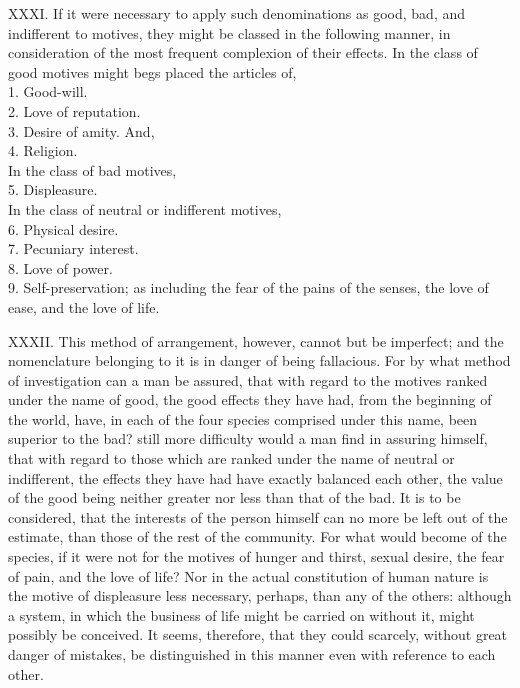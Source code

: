 \documentclass[12pt]{report}
\begin{document}
XXXI. If it were necessary to apply such denominations as good, bad, and
indifferent to motives, they might be classed in the following manner,
in consideration of the most frequent complexion of their effects. In
the class of good motives might begs placed the articles of,\\
1. Good-will.\\
2. Love of reputation.\\
3. Desire of amity. And,\\
4. Religion.\\
In the class of bad motives,\\
5. Displeasure.\\
In the class of neutral or indifferent motives,\\
6. Physical desire.\\
7. Pecuniary interest.\\
8. Love of power.\\
9. Self-preservation; as including the fear of the pains of the senses,
the love of ease, and the love of life.

XXXII. This method of arrangement, however, cannot but be imperfect; and
the nomenclature belonging to it is in danger of being fallacious. For
by what method of investigation can a man be assured, that with regard
to the motives ranked under the name of good, the good effects they have
had, from the beginning of the world, have, in each of the four species
comprised under this name, been superior to the bad? still more
difficulty would a man find in assuring himself, that with regard to
those which are ranked under the name of neutral or indifferent, the
effects they have had have exactly balanced each other, the value of the
good being neither greater nor less than that of the bad. It is to be
considered, that the interests of the person himself can no more be left
out of the estimate, than those of the rest of the community. For what
would become of the species, if it were not for the motives of hunger
and thirst, sexual desire, the fear of pain, and the love of life? Nor
in the actual constitution of human nature is the motive of displeasure
less necessary, perhaps, than any of the others: although a system, in
which the business of life might be carried on without it, might
possibly be conceived. It seems, therefore, that they could scarcely,
without great danger of mistakes, be distinguished in this manner even
with reference to each other.
\end{document}
